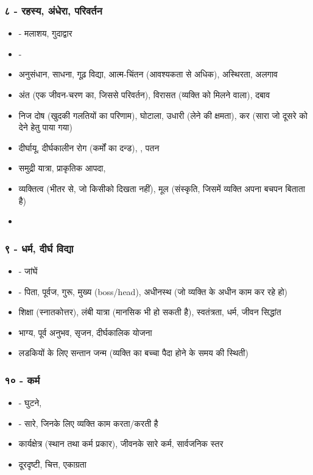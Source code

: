 \subsubsection{८ - रहस्य, अंधेरा, परिवर्तन}
\begin{itemize}
    \item {} - मलाशय, गुदाद्वार
    \item {} - 
    \item अनुसंधान, साधना, गूढ़ विद्या, आत्म-चिंतन (आवश्यकता से अधिक), अस्थिरता, अलगाव
    \item अंत (एक जीवन-चरण का, जिससे परिवर्तन), विरासत (व्यक्ति को मिलने वाला), दबाव
    \item निज दोष (खुदकी गलतियों का परिणाम), घोटाला, उधारी (लेने की क्षमता), कर (सारा जो दूसरे को देने हेतु पाया गया)
    \item दीर्घायू, दीर्घकालीन रोग (कर्मों का दन्ड), , पतन
    \item समुद्री यात्रा, प्राकृतिक आपदा, 
    \item व्यक्तित्व (भीतर से, जो किसीको दिखता नहीं), मूल (संस्कृति, जिसमें व्यक्ति अपना बचपन बिताता है)
    \item {}
\end{itemize}
\subsubsection{९ - धर्म, दीर्घ विद्या}
\begin{itemize}
    \item {} - जांघें
    \item {} - पिता, पूर्वज, गुरू, मुख्य (\textenglish{boss/head}), अधीनस्थ (जो व्यक्ति के अधीन काम कर रहे हो)
    \item शिक्षा (स्नातकोत्तर), लंबी यात्रा (मानसिक भी हो सकती है), स्वतंत्रता, धर्म, जीवन सिद्धांत
    \item भाग्य, पूर्व अनुभव, सृजन, दीर्घकालिक योजना
    \item लडकियों के लिए सन्तान जन्म (व्यक्ति का बच्चा पैदा होने के  समय की स्थिती)
\end{itemize}
\subsubsection{१० - कर्म}
\begin{itemize}
    \item {} - घुटने, 
    \item {} - सारे, जिनके लिए व्यक्ति काम करता/करती है
    \item कार्यक्षेत्र (स्थान तथा कर्म प्रकार), जीवनके सारे कर्म, सार्वजनिक स्तर
    \item दूरदृष्टी, चित्त, एकाग्रता
\end{itemize}
